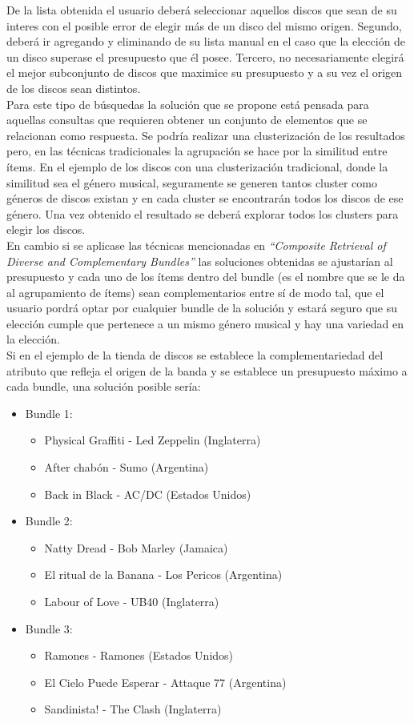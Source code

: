 De la lista obtenida el usuario deberá seleccionar aquellos discos que sean de su interes con el posible error de elegir más de un disco del mismo origen. Segundo, deberá ir agregando y eliminando de su lista manual en el caso que la elección de un disco superase el presupuesto que él posee. Tercero, no necesariamente elegirá el mejor subconjunto de discos que maximice su presupuesto y a su vez el origen de los discos sean distintos.\\
Para este tipo de búsquedas la solución que se propone está pensada para aquellas consultas que requieren obtener un conjunto de elementos que se relacionan como respuesta. Se podría realizar una clusterización de los resultados pero, en las técnicas tradicionales la agrupación se hace por la similitud entre ítems. En el ejemplo de los discos con una clusterización tradicional, donde la similitud sea el género musical, seguramente se generen tantos cluster como géneros de discos existan y en cada cluster se encontrarán todos los discos de ese género. Una vez obtenido el resultado se deberá explorar todos los clusters para elegir los discos.\\
En cambio si se aplicase las técnicas mencionadas en \textit{``Composite Retrieval of Diverse and Complementary Bundles''} las soluciones obtenidas se ajustarían al presupuesto y cada uno de los ítems dentro del bundle (es el nombre que se le da al agrupamiento de ítems) sean complementarios entre sí de modo tal, que el usuario pordrá optar por cualquier bundle de la solución y estará seguro que su elección cumple que pertenece a un mismo género musical y hay una variedad en la elección.\\
Si en el ejemplo de la tienda de discos se establece la complementariedad del atributo que refleja el origen de la banda y se establece un presupuesto máximo a cada bundle, una solución posible sería:
\begin{itemize}
  \item Bundle 1:
  \begin{itemize}
    \item Physical Graffiti - Led Zeppelin (Inglaterra)
    \item After chabón - Sumo (Argentina)
    \item Back in Black - AC/DC (Estados Unidos)
  \end{itemize}
  \item Bundle 2:
  \begin{itemize}
    \item Natty Dread - Bob Marley (Jamaica)
    \item El ritual de la Banana - Los Pericos (Argentina)
    \item Labour of Love - UB40 (Inglaterra)
  \end{itemize}
	  \item Bundle 3:
  \begin{itemize}
    \item Ramones - Ramones (Estados Unidos)
    \item El Cielo Puede Esperar - Attaque 77 (Argentina)
    \item Sandinista! - The Clash (Inglaterra)
  \end{itemize}
\end{itemize}

